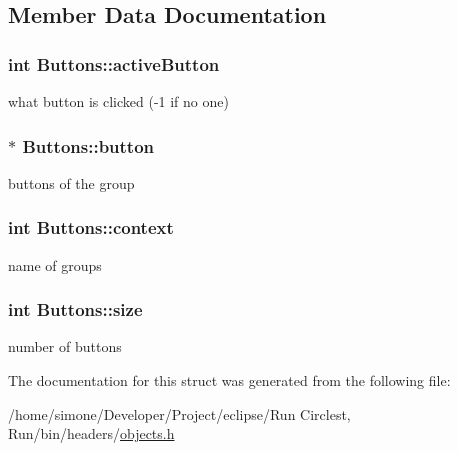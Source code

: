\subsection{Member Data Documentation}
\hypertarget{struct_buttons_ad25112dd3156a2a1fb7dfb9a4bb00095}{
\subsubsection[{active\-Button}]{\setlength{\rightskip}{0pt plus 5cm}int Buttons\-::active\-Button}}\label{struct_buttons_ad25112dd3156a2a1fb7dfb9a4bb00095}
what button is clicked (-\/1 if no one) \hypertarget{struct_buttons_a741ed7bb5347a62472b3408c9e48b393}{
\subsubsection[{button}]{$\ast$ Buttons\-::button}}\label{struct_buttons_a741ed7bb5347a62472b3408c9e48b393}
buttons of the group \hypertarget{struct_buttons_a3c4e94e82358cd6d636bd9e4d898d46c}{
\subsubsection[{context}]{\setlength{\rightskip}{0pt plus 5cm}int Buttons\-::context}}\label{struct_buttons_a3c4e94e82358cd6d636bd9e4d898d46c}
name of groups \hypertarget{struct_buttons_a3ec3d2690b6f02e73a71b89891292422}{
\subsubsection[{size}]{\setlength{\rightskip}{0pt plus 5cm}int Buttons\-::size}}\label{struct_buttons_a3ec3d2690b6f02e73a71b89891292422}
number of buttons 

The documentation for this struct was generated from the following file\-:\begin{DoxyCompactItemize}
\item 
/home/simone/\-Developer/\-Project/eclipse/\-Run Circlest, Run/bin/headers/\hyperlink{objects_8h}{objects.\-h}\end{DoxyCompactItemize}
